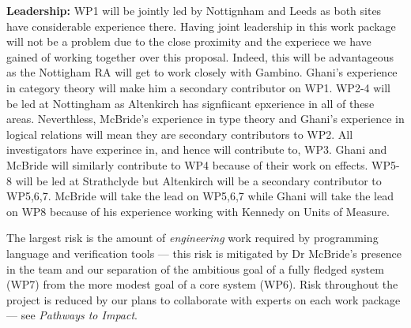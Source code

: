 \documentclass[a4paper,11pt]{article}
\begin{document}
{\bf Leadership:} WP1 will be jointly led by Nottignham and Leeds as
both sites have considerable experience there. Having joint leadership
in this work package will not be a problem due to the close proximity
and the experiece we have gained of working together over this
proposal. Indeed, this will be advantageous as the Nottigham RA will
get to work closely with Gambino. Ghani's experience in category
theory will make him a secondary contributor on WP1. WP2-4 will be led
at Nottingham as Altenkirch has signfiicant epxerience in all of these
areas. Neverthless, McBride's experience in type theory and Ghani's
experience in logical relations will mean they are secondary
contributors to WP2. All investigators have experince in, and hence
will contribute to, WP3. Ghani and McBride will similarly contribute
to WP4 because of their work on effects. WP5-8 will be led at
Strathclyde but Altenkirch will be a secondary contributor to
WP5,6,7. McBride will take the lead on WP5,6,7 while Ghani will take
the lead on WP8 because of his experience working with Kennedy on
Units of Measure.

The largest risk is the 
amount of {\em engineering} work required by programming language
and verification tools --- this risk is mitigated by Dr McBride's
presence in the team and our 
separation of the ambitious
goal of a fully fledged system (WP7) from the more modest
goal of a core system (WP6). Risk throughout the project is reduced by
our plans to collaborate
with experts on each work package --- see {\em Pathways to Impact}. 
\end{document}
